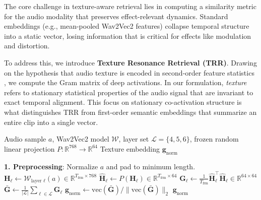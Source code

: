 The core challenge in texture-aware retrieval lies in computing a similarity metric for the audio modality that preserves effect-relevant dynamics. Standard embeddings (e.g., mean-pooled Wav2Vec2 features) collapse temporal structure into a static vector, losing information that is critical for effects like modulation and distortion.

To address this, we introduce \textbf{Texture Resonance Retrieval (TRR)}. Drawing on the hypothesis that audio texture is encoded in second-order feature statistics \citep{mcdermott2011sound}, we compute the Gram matrix of deep activations. In our formulation, \textit{texture} refers to stationary statistical properties of the audio signal that are invariant to exact temporal alignment. This focus on stationary co-activation structure is what distinguishes TRR from first-order semantic embeddings that summarize an entire clip into a single vector.

\begin{algorithm}[ht]
		\caption{TRR Encoding}
		\label{alg:trr_encoding}
		\begin{algorithmic}
			\REQUIRE Audio sample $a$, Wav2Vec2 model $\mathcal{W}$, layer set $\mathcal{L}=\{4,5,6\}$, frozen random linear projection $P:\mathbb{R}^{768}\rightarrow\mathbb{R}^{64}$
			\ENSURE Texture embedding $\mathbf{g}_{\text{norm}}$

			\STATE \textbf{1. Preprocessing}: Normalize $a$ and pad to minimum length.
			\STATE $\mathbf{H}_{\ell} \leftarrow \mathcal{W}_{\text{layer }\ell}(a) \in \mathbb{R}^{T_{\text{frm}} \times 768}$
			\STATE $\widehat{\mathbf{H}}_{\ell} \leftarrow P(\mathbf{H}_{\ell}) \in \mathbb{R}^{T_{\text{frm}} \times 64}$ 
			\STATE $\mathbf{G}_{\ell} \leftarrow \frac{1}{T_{\text{frm}}}\widehat{\mathbf{H}}_{\ell}^{\top}\widehat{\mathbf{H}}_{\ell} \in \mathbb{R}^{64 \times 64}$
			\ENDFOR
			\STATE $\bar{\mathbf{G}} \leftarrow \frac{1}{|\mathcal{L}|}\sum_{\ell\in\mathcal{L}}\mathbf{G}_{\ell}$
			\STATE $\mathbf{g}_{\text{norm}} \leftarrow \mathrm{vec}(\bar{\mathbf{G}}) / \|\mathrm{vec}(\bar{\mathbf{G}})\|_2$
		\RETURN $\mathbf{g}_{\text{norm}}$
	\end{algorithmic}
\end{algorithm}

